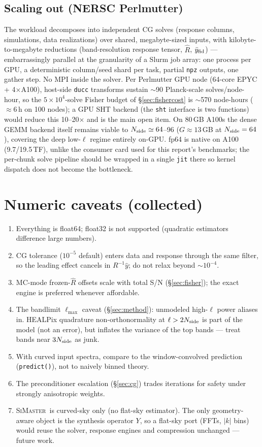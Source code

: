 \documentclass[11pt,a4paper]{article}
\newcommand{\simaster}{\textsc{SiMaster}}
\begin{document}
\subsection{Scaling out (NERSC Perlmutter)}
The workload decomposes into independent CG solves (response columns,
simulations, data realizations) over shared, megabyte-sized inputs, with
kilobyte-to-megabyte reductions (band-resolution response tensor, $\hat R$,
$\bar y_{\rm fid}$) --- embarrassingly parallel at the granularity of a
Slurm job array: one process per GPU, a deterministic column/seed shard per
task, partial \texttt{npz} outputs, one gather step.  No MPI inside the
solver.  Per Perlmutter GPU node (64-core EPYC + 4$\times$A100), host-side
\texttt{ducc} transforms sustain $\sim$90 Planck-scale solves/node-hour, so
the $5\times10^4$-solve Fisher budget of \S\ref{sec:fishercost} is
$\sim$570 node-hours ($\approx$6\,h on 100 nodes); a GPU SHT backend (the
\texttt{sht} interface is two functions) would reduce this
10--20$\times$ and is the main open item.  On 80\,GB A100s the dense GEMM
backend itself remains viable to $N_{\rm side}\simeq64$--96
($G\approx13$\,GB at $N_{\rm side}=64$), covering the deep low-$\ell$
regime entirely on-GPU.  fp64 is native on A100 (9.7/19.5\,TF), unlike the
consumer card used for this report's benchmarks; the per-chunk solve
pipeline should be wrapped in a single \texttt{jit} there so kernel
dispatch does not become the bottleneck.

\section{Numeric caveats (collected)}
\begin{enumerate}
\item Everything is float64; float32 is not supported (quadratic
  estimators difference large numbers).
\item CG tolerance ($10^{-5}$ default) enters data and response through the
  same filter, so the leading effect cancels in $R^{-1}\hat y$; do not
  relax beyond $\sim10^{-4}$.
\item MC-mode frozen-$\hat R$ offsets scale with total S/N
  (\S\ref{sec:fisher}); the exact engine is preferred whenever affordable.
\item The bandlimit $\ell_{\max}$ caveat (\S\ref{sec:method}): unmodeled
  high-$\ell$ power aliases in.  HEALPix quadrature non-orthonormality at
  $\ell>2N_{\rm side}$ is part of the model (not an error), but inflates
  the variance of the top bands --- treat bands near $3N_{\rm side}$ as junk.
\item With curved input spectra, compare to the window-convolved prediction
  (\texttt{predict()}), not to naively binned theory.
\item The preconditioner escalation (\S\ref{sec:cg}) trades iterations for
  safety under strongly anisotropic weights.
\item \simaster\ is curved-sky only (no flat-sky estimator).  The only
  geometry-aware object is the synthesis operator $Y$, so a flat-sky port
  (FFTs, $|k|$ bins) would reuse the solver, response engines and
  compression unchanged --- future work.
\end{enumerate}
\end{document}
